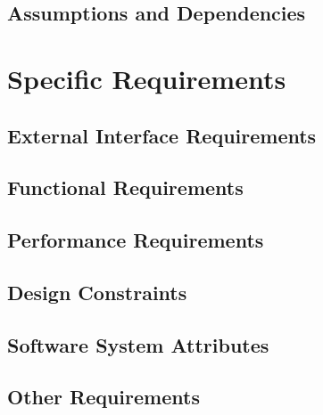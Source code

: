 \documentclass[a4paper,12pt]{article}
\begin{document}
\subsection{Assumptions and Dependencies}

\section{Specific Requirements}

\subsection{External Interface Requirements}

\subsection{Functional Requirements}

\subsection{Performance Requirements}

\subsection{Design Constraints}

\subsection{Software System Attributes}

\subsection{Other Requirements}

\newpage
\clearpage
{}
\end{document}
